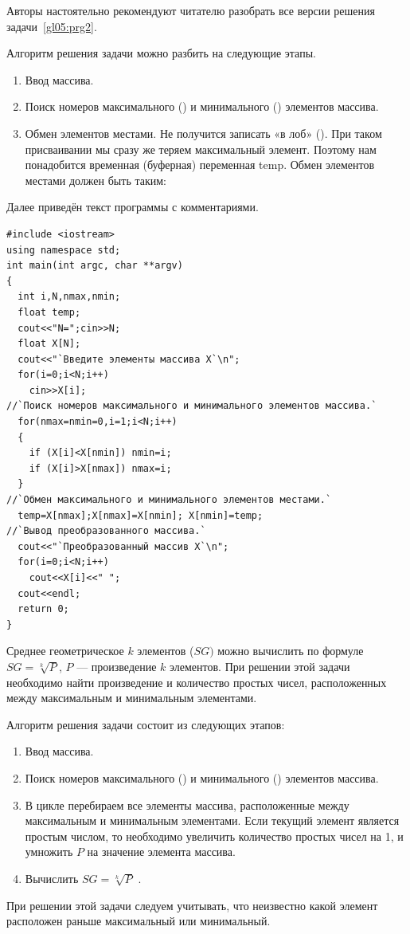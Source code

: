 Авторы настоятельно рекомендуют читателю разобрать все версии решения задачи~\ref{gl05:prg2}.


Алгоритм решения задачи можно разбить на следующие этапы.

\begin{enumerate}
\item Ввод массива.
\item Поиск номеров максимального () и минимального () элементов массива.
\item Обмен элементов местами. Не получится записать «в лоб» (). 
При таком присваивании мы сразу же теряем максимальный элемент. 
Поэтому нам понадобится временная (буферная) переменная temp. Обмен элементов
местами должен быть таким:

\end{enumerate}

Далее приведён текст программы с комментариями.
\begin{lstlisting}
#include <iostream>
using namespace std;
int main(int argc, char **argv)
{
  int i,N,nmax,nmin;
  float temp;
  cout<<"N=";cin>>N;
  float X[N];
  cout<<"`Введите элементы массива Х`\n";
  for(i=0;i<N;i++)
    cin>>X[i];
//`Поиск номеров максимального и минимального элементов массива.`
  for(nmax=nmin=0,i=1;i<N;i++)
  {
    if (X[i]<X[nmin]) nmin=i;
    if (X[i]>X[nmax]) nmax=i;
  }
//`Обмен максимального и минимального элементов местами.`
  temp=X[nmax];X[nmax]=X[nmin]; X[nmin]=temp;
//`Вывод преобразованного массива.`
  cout<<"`Преобразованный массив Х`\n";
  for(i=0;i<N;i++)
    cout<<X[i]<<" ";
  cout<<endl;
  return 0;
}
\end{lstlisting}



Среднее геометрическое $k$ элементов ($SG)$ можно вычислить по формуле 
$SG=\sqrt[{k}]{P}$, $P$ --- произведение $k$ элементов. При решении этой задачи
необходимо найти  произведение и количество простых чисел, расположенных между максимальным и минимальным элементами.

Алгоритм решения задачи состоит из следующих этапов:

\begin{enumerate}
\item Ввод массива.
\item Поиск номеров максимального () и минимального () элементов массива.
\item В цикле перебираем все элементы массива, расположенные между максимальным и минимальным элементами. Если текущий
элемент является простым числом, то необходимо увеличить количество простых чисел на 1, и умножить $P$ на значение
элемента массива.
\item Вычислить  $SG=\sqrt[{k}]{P}$ .
\end{enumerate}
При решении этой задачи следуем учитывать, что неизвестно какой элемент расположен раньше максимальный или минимальный.

